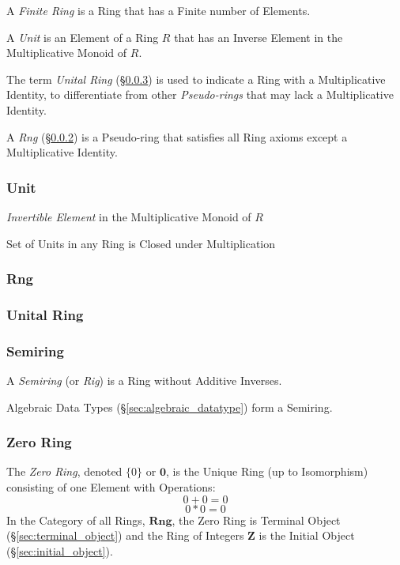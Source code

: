 A \emph{Finite Ring} is a Ring that has a Finite number of Elements.

A \emph{Unit} is an Element of a Ring $R$ that has an Inverse
Element in the Multiplicative Monoid of $R$.

The term \emph{Unital Ring} (\S\ref{sec:unital_ring}) is used to
indicate a Ring with a Multiplicative Identity, to differentiate from
other \emph{Pseudo-rings} that may lack a Multiplicative Identity.

A \emph{Rng} (\S\ref{sec:rng}) is a Pseudo-ring that satisfies all
Ring axioms except a Multiplicative Identity.



\subsubsection{Unit}\label{sec:ring_unit}

\emph{Invertible Element} in the Multiplicative Monoid of $R$

Set of Units in any Ring is Closed under Multiplication



\subsubsection{Rng}\label{sec:rng}

\subsubsection{Unital Ring}\label{sec:unital_ring}

\subsubsection{Semiring}\label{sec:semiring}

A \emph{Semiring} (or \emph{Rig}) is a Ring without Additive Inverses.

Algebraic Data Types (\S\ref{sec:algebraic_datatype}) form a Semiring.



\subsubsection{Zero Ring}\label{sec:zero_ring}

The \emph{Zero Ring}, denoted $\{0\}$ or $\mathbf{0}$, is the Unique Ring
(up to Isomorphism) consisting of one Element with Operations:
\[
    0 + 0 = 0
\] \[
    0 * 0 = 0
\]
In the Category of all Rings, $\mathbf{Rng}$, the Zero Ring is
Terminal Object (\S\ref{sec:terminal_object}) and the Ring of Integers
$\mathbf{Z}$ is the Initial Object (\S\ref{sec:initial_object}).



